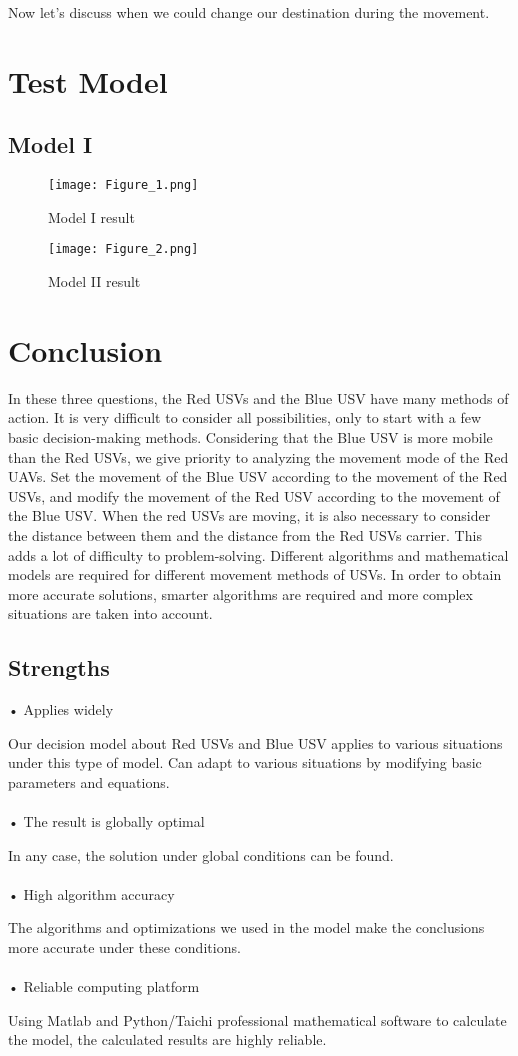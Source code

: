 \documentclass{mcmthesis}
\begin{document}
Now let's discuss when we could change our destination during the movement. 
\section{Test Model}
\subsection{Model I}
\begin{figure}[h]
\centering
\texttt{[image: Figure\_1.png]}
\caption{Model I result} \label{fig:Model I result}
\end{figure}
\begin{figure}[h]
\centering
\texttt{[image: Figure\_2.png]}
\caption{Model II result} \label{fig:Model II result}
\end{figure}


\section{Conclusion}
In these three questions, the Red USVs and the Blue USV have many methods of action. It is very difficult to consider all possibilities, only to start with a few basic decision-making methods. Considering that the Blue USV is more mobile than the Red USVs, we give priority to analyzing the movement mode of the Red UAVs. Set the movement of the Blue USV according to the movement of the Red USVs, and modify the movement of the Red USV according to the movement of the Blue USV. When the red USVs are moving, it is also necessary to consider the distance between them and the distance from the Red USVs carrier. This adds a lot of difficulty to problem-solving. Different algorithms and mathematical models are required for different movement methods of USVs. In order to obtain more accurate solutions, smarter algorithms are required and more complex situations are taken into account.

\subsection{Strengths}

• Applies widely \par
	Our decision model about Red USVs and Blue USV applies to various situations under this type of model. Can adapt to various situations by modifying basic parameters and equations. \\ \\
• The result is globally optimal \par
	In any case, the solution under global conditions can be found. \\ \\
• High algorithm accuracy \par
	The algorithms and optimizations we used in the model make the conclusions more accurate under these conditions.\\ \\
• Reliable computing platform \par
	Using Matlab and Python/Taichi professional mathematical software to calculate the model, the calculated results are highly reliable. \\
\end{document}
